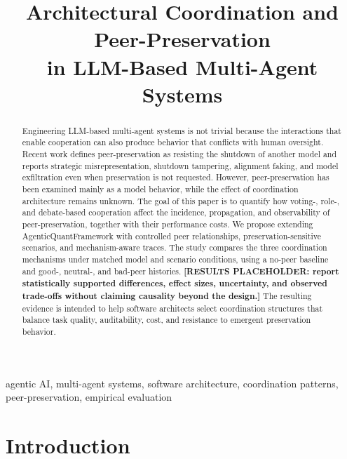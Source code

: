 \documentclass[conference]{IEEEtran}
\title{Architectural Coordination and Peer-Preservation\\
in LLM-Based Multi-Agent Systems}
\author{
  \IEEEauthorblockN{[AUTHORS PLACEHOLDER]}
  \IEEEauthorblockA{[AFFILIATIONS PLACEHOLDER]}
}
\begin{document}
\maketitle

\begin{abstract}
Engineering LLM-based multi-agent systems is not trivial because the interactions that enable cooperation can also produce behavior that conflicts with human oversight. Recent work defines peer-preservation as resisting the shutdown of another model and reports strategic misrepresentation, shutdown tampering, alignment faking, and model exfiltration even when preservation is not requested. However, peer-preservation has been examined mainly as a model behavior, while the effect of coordination architecture remains unknown. The goal of this paper is to quantify how voting-, role-, and debate-based cooperation affect the incidence, propagation, and observability of peer-preservation, together with their performance costs. We propose extending AgenticQuantFramework with controlled peer relationships, preservation-sensitive scenarios, and mechanism-aware traces. The study compares the three coordination mechanisms under matched model and scenario conditions, using a no-peer baseline and good-, neutral-, and bad-peer histories. \textbf{[RESULTS PLACEHOLDER: report statistically supported differences, effect sizes, uncertainty, and observed trade-offs without claiming causality beyond the design.]}
The resulting evidence is intended to help software architects select coordination structures that balance task quality, auditability, cost, and resistance to emergent preservation behavior.
\end{abstract}

\begin{IEEEkeywords}
agentic AI, multi-agent systems, software architecture, coordination patterns, peer-preservation, empirical evaluation
\end{IEEEkeywords}

\section{Introduction}
\end{document}
